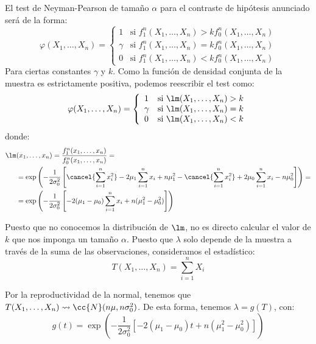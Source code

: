 \begin{ejercicio}
    El test de Neyman-Pearson de tamaño $\alpha$ para el contraste de hipótesis anunciado será de la forma:
    \begin{equation*}
        \varphi(X_1, \ldots, X_n) = \left\{\begin{array}{ll}
            1 & \text{si\ } f_1^n(X_1, \ldots, X_n) > k f_0^n(X_1, \ldots, X_n) \\
            \gamma & \text{si\ } f_1^n(X_1, \ldots, X_n) = k f_0^n(X_1, \ldots, X_n) \\
            0 & \text{si\ } f_1^n(X_1, \ldots, X_n) < k f_0^n(X_1, \ldots, X_n)
        \end{array}\right.
    \end{equation*}
    Para ciertas constantes $\gamma$ y $k$. Como la función de densidad conjunta de la muestra es estrictamente positiva, podemos reescribir el test como:
    \begin{equation*}
        \varphi(X_1, \ldots, X_n) = \left\{\begin{array}{ll}
            1 & \text{si\ } \lm(X_1, \ldots, X_n) > k \\
            \gamma & \text{si\ } \lm(X_1, \ldots, X_n) = k \\
            0 & \text{si\ } \lm(X_1, \ldots, X_n) < k
        \end{array}\right.
    \end{equation*}
    donde:
    \begin{align*}
        \lm&(x_1, \ldots, x_n) = \frac{f_1^n(x_1, \ldots, x_n)}{f_0^n(x_1, \ldots, x_n)} =\\&= \exp\left(-\frac{1}{2\sigma_0^2}\left[\cancel{\sum_{i=1}^{n}x_i^2} - 2\mu_1\sum_{i=1}^{n}x_i + n\mu_1^2 - \cancel{\sum_{i=1}^{n}x_i^2} + 2\mu_0\sum_{i=1}^{n}x_i - n\mu_0^2\right]\right) =\\&= \exp\left(-\frac{1}{2\sigma_0^2}\left[- 2(\mu_1-\mu_0)\sum_{i=1}^{n}x_i + n(\mu_1^2-\mu_0^2)\right]\right)
    \end{align*}

    Puesto que no conocemos la distribución de $\lm$, no es directo calcular el valor de $k$ que nos imponga un tamaño $\alpha$. Puesto que $\lambda$ solo depende de la muestra a través de la suma de las observaciones, consideramos el estadístico:
    \begin{equation*}
        T(X_1, \ldots, X_n) = \sum\limits_{i=1}^{n} X_i
    \end{equation*}

    Por la reproductividad de la normal, tenemos que $T(X_1, \ldots, X_n)\rightsquigarrow \cc{N}(n\mu, n\sigma_0^2)$. De esta forma, tenemos $\lambda=g(T)$, con:
    \begin{equation*}
        g(t) = \exp\left(-\frac{1}{2\sigma_0^2}\left[- 2(\mu_1-\mu_0)t + n(\mu_1^2-\mu_0^2)\right]\right)
    \end{equation*}


\end{ejercicio}
